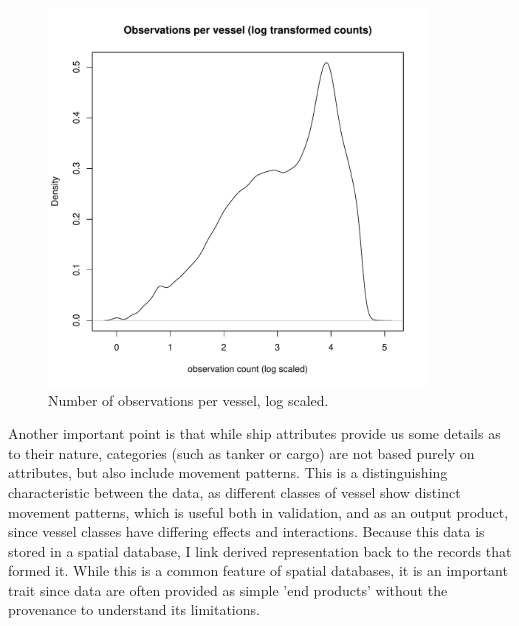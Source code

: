 \begin{figure}[htbp]
  \centering
  \includegraphics[width=100mm]{figures/obs-per-vessel-log.pdf}
  \caption{Number of observations per vessel, log scaled.}
  \label{fig:obs-per-vessel-log}
\end{figure}




Another important point is that while ship attributes provide us some details as to their nature, categories (such as tanker or cargo) are not based purely on attributes, but also include movement patterns. This is a distinguishing characteristic between the data, as different classes of vessel show distinct movement patterns, which is useful both in validation, and as an output product, since vessel classes have differing effects and interactions. Because this data is stored in a spatial database, I link derived representation %
back to the records that formed it. While this is a common feature of spatial databases, it is an important trait since data are often provided as simple 'end products' without the provenance to understand its limitations.

